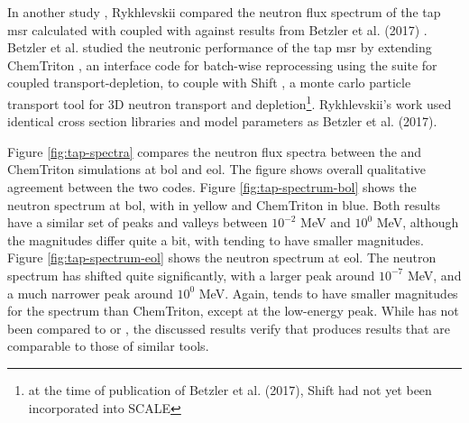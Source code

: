 In another study \cite{rykhlevskii_fuel_2020},
Rykhlevskii compared the neutron flux spectrum of the \Gls{tap} \Gls{msr}
calculated with \SaltProc coupled with \SerpentTWO against results from
Betzler et al. (2017) \cite{betzler_assessment_2017}. Betzler et al. studied the
neutronic performance of the \Gls{tap} \Gls{msr} by extending ChemTriton
\cite{betzler_molten_2017}, an interface code for batch-wise reprocessing
using the \SCALE suite for coupled transport-depletion, to couple with Shift
\cite{davidson_nuclide_2018}, a monte carlo particle transport tool for 3D
neutron transport and depletion\footnote{at the time of publication of Betzler
et al. (2017), Shift had not yet been incorporated into SCALE}.
Rykhlevskii's work used identical cross section libraries and model parameters as
Betzler et al. (2017).

Figure \ref{fig:tap-spectra} compares the neutron flux spectra between the
\SaltProc and ChemTriton simulations at \Gls{bol} and \gls{eol}. The
figure shows overall qualitative agreement between the two codes. Figure \ref{fig:tap-spectrum-bol}
shows the neutron spectrum at \Gls{bol}, with \SaltProc in yellow and ChemTriton in blue.
Both results have a similar set of peaks and valleys between $10^{-2}$ MeV and
$10^{0}$ MeV, although the magnitudes differ quite a bit, with \SaltProc
tending to have smaller magnitudes. Figure \ref{fig:tap-spectrum-eol} shows the neutron spectrum
at \Gls{eol}. The neutron spectrum has shifted quite significantly, with a larger peak around $10^{-7}$
MeV, and a much narrower peak around $10^{0}$ MeV. Again, \SaltProc tends to have smaller magnitudes
for the spectrum than ChemTriton, except at the low-energy peak. While \SaltProc has not been compared
to \SCALE or \ADDER, the discussed results verify that \SaltProc produces results that are comparable
to those of similar tools.

